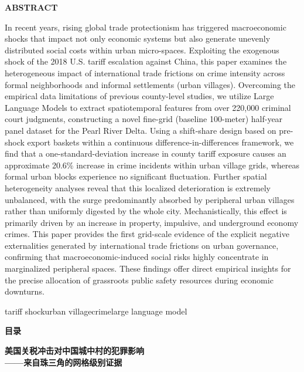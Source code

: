 \documentclass[a4paper,12pt]{report}
\makeatletter
\providecommand{\songti}{}
\renewcommand{\songti}{\CJKfamily{song}}
\newenvironment{enabstract}{%
  \par
  \begin{center}
    {\rmfamily\zihao{-4}\bfseries ABSTRACT}
  \end{center}
  \rmfamily\zihao{-4}%
}{\par}
\newcommand{\enkeywords}[1]{%
  \par\noindent\hspace*{2em}{\rmfamily\zihao{-4}\bfseries KEYWORDS:}%
  {\rmfamily\zihao{-4}#1}\par
}
\renewcommand{\tableofcontents}{%
  \newpage
  \begin{center}
    {\songti\zihao{3}\bfseries 目\hspace{2em}录}
  \end{center}
  \vspace{\baselineskip}
  {\setlength{\baselineskip}{22pt}\selectfont\@starttoc{toc}}%
}
\makeatother
\begin{document}
\newpage
\begin{enabstract}
In recent years, rising global trade protectionism has triggered macroeconomic shocks that impact not only economic systems but also generate unevenly distributed social costs within urban micro-spaces. Exploiting the exogenous shock of the 2018 U.S. tariff escalation against China, this paper examines the heterogeneous impact of international trade frictions on crime intensity across formal neighborhoods and informal settlements (urban villages). Overcoming the empirical data limitations of previous county-level studies, we utilize Large Language Models to extract spatiotemporal features from over 220,000 criminal court judgments, constructing a novel fine-grid (baseline 100-meter) half-year panel dataset for the Pearl River Delta. Using a shift-share design based on pre-shock export baskets within a continuous difference-in-differences framework, we find that a one-standard-deviation increase in county tariff exposure causes an approximate 20.6\% increase in crime incidents within urban village grids, whereas formal urban blocks experience no significant fluctuation. Further spatial heterogeneity analyses reveal that this localized deterioration is extremely unbalanced, with the surge predominantly absorbed by peripheral urban villages rather than uniformly digested by the whole city. Mechanistically, this effect is primarily driven by an increase in property, impulsive, and underground economy crimes. This paper provides the first grid-scale evidence of the explicit negative externalities generated by international trade frictions on urban governance, confirming that macroeconomic-induced social risks highly concentrate in marginalized peripheral spaces. These findings offer direct empirical insights for the precise allocation of grassroots public safety resources during economic downturns.
\end{enabstract}
\enkeywords{\hspace{0.5em}tariff shock\hspace{2em}urban village\hspace{2em}crime\hspace{2em}large language model}

\newpage
\setcounter{tocdepth}{1}
\tableofcontents
\newpage

{\centering\songti{}\bfseries 美国关税冲击对中国城中村的犯罪影响\\——来自珠三角的网格级别证据\par}
\vspace{1em}
\end{document}
